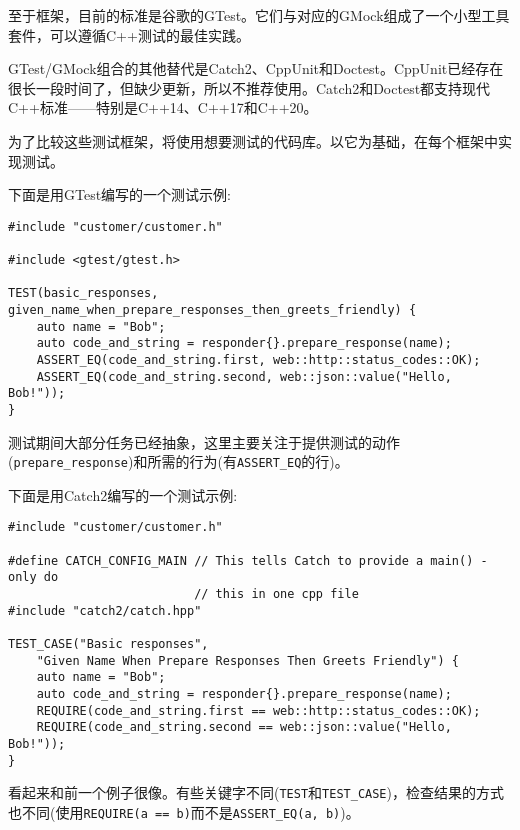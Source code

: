 
至于框架，目前的标准是谷歌的GTest。它们与对应的GMock组成了一个小型工具套件，可以遵循C++测试的最佳实践。

GTest/GMock组合的其他替代是Catch2、CppUnit和Doctest。CppUnit已经存在很长一段时间了，但缺少更新，所以不推荐使用。Catch2和Doctest都支持现代C++标准——特别是C++14、C++17和C++20。

为了比较这些测试框架，将使用想要测试的代码库。以它为基础，在每个框架中实现测试。


下面是用GTest编写的一个测试示例:

\begin{lstlisting}[style=styleCXX]
#include "customer/customer.h"

#include <gtest/gtest.h>

TEST(basic_responses,
given_name_when_prepare_responses_then_greets_friendly) {
	auto name = "Bob";
	auto code_and_string = responder{}.prepare_response(name);
	ASSERT_EQ(code_and_string.first, web::http::status_codes::OK);
	ASSERT_EQ(code_and_string.second, web::json::value("Hello, Bob!"));
}
\end{lstlisting}

测试期间大部分任务已经抽象，这里主要关注于提供测试的动作(\texttt{prepare\_response})和所需的行为(有\texttt{ASSERT\_EQ}的行)。


下面是用Catch2编写的一个测试示例:

\begin{lstlisting}[style=styleCXX]
#include "customer/customer.h"

#define CATCH_CONFIG_MAIN // This tells Catch to provide a main() - only do
						  // this in one cpp file
#include "catch2/catch.hpp"

TEST_CASE("Basic responses",
	"Given Name When Prepare Responses Then Greets Friendly") {
	auto name = "Bob";
	auto code_and_string = responder{}.prepare_response(name);
	REQUIRE(code_and_string.first == web::http::status_codes::OK);
	REQUIRE(code_and_string.second == web::json::value("Hello, Bob!"));
}
\end{lstlisting}

看起来和前一个例子很像。有些关键字不同(\texttt{TEST}和\texttt{TEST\_CASE})，检查结果的方式也不同(使用\texttt{REQUIRE(a == b)}而不是\texttt{ASSERT\_EQ(a, b)})。



